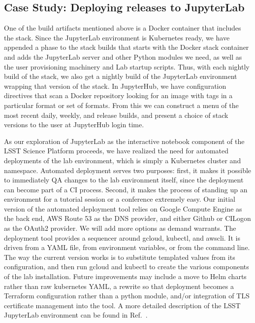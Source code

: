 \subsection{Case Study: Deploying releases to JupyterLab}
\label{sec:jupyterlab}

One of the build artifacts mentioned above is a Docker container that includes the stack.
Since the
JupyterLab environment is Kubernetes ready, we have appended a phase to
the stack builds that starts with the Docker stack container and adds
the JupyterLab server and other Python modules we need, as well as the
user provisioning machinery and Lab startup scripts.  Thus, with each
nightly build of the stack, we also get a nightly build of the
JupyterLab environment wrapping that version of the stack.  In
JupyterHub, we have configuration directives that scan a Docker
repository looking for an image with tags in a particular format or set
of formats.  From this we can construct a menu of the most recent daily,
weekly, and release builds, and present a choice of stack versions to
the user at JupyterHub login time.

As our exploration of JupyterLab as the interactive notebook component
of the LSST Science Platform\cite{LSE-319} proceeds, we have realized the need for
automated deployments of the lab environment, which is simply a
Kubernetes cluster and namespace.  Automated deployment serves two
purposes: first, it makes it possible to immediately QA changes to the
lab environment itself, since the deployment can become part of a CI
process.  Second, it makes the process of standing up an environment for
a tutorial session or a conference extremely easy.  Our initial version
of the automated deployment tool relies on Google Compute Engine as the
back end, AWS Route 53 as the DNS provider, and either Github or CILogon
as the OAuth2 provider.  We will add more options as demand warrants.
The deployment tool provides a sequencer around gcloud, kubectl, and
awscli.  It is driven from a YAML file, from environment variables, or
from the command line.  The way the current version works is to
substitute templated values from its configuration, and then run gcloud
and kubectl to create the various components of the lab installation.
Future improvements may include a move to Helm charts rather than raw
kubernetes YAML, a rewrite so that deployment becomes a Terraform
configuration rather than a python module, and/or integration of TLS
certificate management into the tool.
 A more detailed description of the LSST JupyterLab environment can be found in Ref.~.

